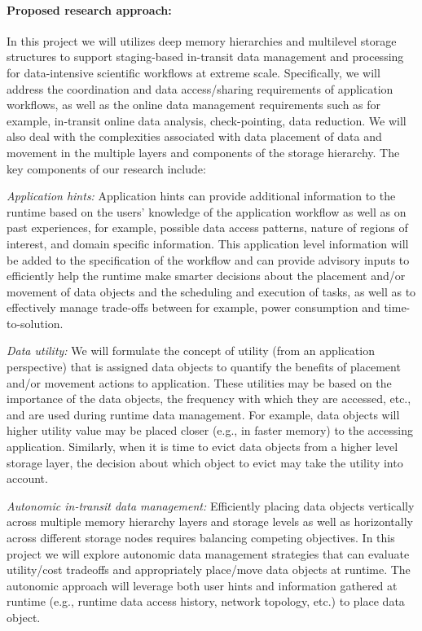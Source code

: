 \paragraph{Proposed research approach:} In this project we will utilizes deep memory hierarchies and multilevel storage structures to support staging-based in-transit data management and processing for data-intensive scientific workflows at extreme scale. Specifically, we will address the coordination and data access/sharing requirements of application workflows, as well as the  online data management requirements such as for example, in-transit online data analysis,  check-pointing,  data reduction. We will also deal with the complexities associated with data placement of data and movement in the multiple layers and components of the storage hierarchy. The key components of our research include: 

{\em Application hints:}  Application hints can provide additional information to the runtime based on the users' knowledge of the application workflow as well as on past experiences, for example, possible data access patterns, nature of regions of interest, and domain specific information. This application level information will be added to the specification of the workflow and can provide advisory inputs to efficiently help the runtime make smarter decisions about the placement and/or movement of data objects and the scheduling and execution of tasks, as well as to effectively manage trade-offs between for example, power consumption and time-to-solution. 

{\em Data utility:} We will formulate the concept of utility (from an application perspective) that is assigned data objects to quantify the benefits of placement and/or movement actions to application. These utilities may be based on the importance of the data objects, the frequency with which they are accessed, etc., and are used during runtime data management. For example, data objects will higher utility value may be placed closer (e.g., in faster memory) to the accessing application. Similarly, when it is time to evict data objects from a higher level storage layer, the decision about which object to evict may take the utility into account. 

{\em Autonomic in-transit data management:} Efficiently placing data objects vertically across multiple memory hierarchy layers and storage levels as well as horizontally across different storage nodes requires balancing competing objectives. In this project we will explore autonomic data management strategies that can  evaluate utility/cost tradeoffs and appropriately place/move data objects at runtime. The autonomic approach will leverage both user hints and information gathered at  runtime (e.g., runtime data access history, network topology, etc.) to place data object. 

